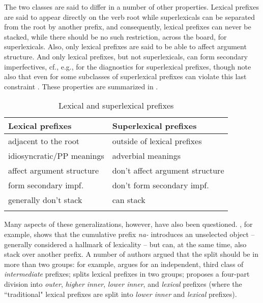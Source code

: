 \documentclass[output=paper,colorlinks,citecolor=brown]{langscibook}
\begin{document}

\noindent The two classes are said to differ in a number of other properties. Lexical prefixes are said to appear directly on the verb root while superlexicals can be separated from the root by another prefix, and consequently, lexical prefixes can never be stacked, while there should be no such restriction, across the board, for superlexicals. Also, only lexical prefixes are said to be able to affect argument structure. And only lexical prefixes, but not superlexicals, can form secondary imperfectives, cf., e.g., \citet[229]{svenonius2004slavic} for the diagnostics for superlexical prefixes, though note also that even for \citeauthor{svenonius2004slavic} some subclasses of superlexical prefixes can violate this last constraint  \citep[230]{svenonius2004slavic}. These properties are summarized in .

\begin{table}
\begin{tabular}{l l } 
 \lsptoprule
  {Lexical prefixes} &  {Superlexical prefixes}  \\
  \midrule
  adjacent to the root & outside of lexical prefixes  \\
 idiosyncratic/PP meanings & adverbial meanings \\ 
affect argument structure & don't affect argument structure  \\
form secondary impf. & don't form secondary impf.  \\
 generally don't stack & can stack  \\  
 \lspbottomrule
\end{tabular}
    \caption{Lexical and superlexical prefixes}
    \label{tab:LexAndSuperLex}
\end{table}

Many aspects of these generalizations, however, have also been questioned. \citet{zaucer2009vp}, for example, shows that the cumulative prefix \textit{na-} introduces an unselected object -- generally considered a hallmark of lexicality -- but can, at the same time, also stack over another prefix. A number of authors argued that the split should be in more than two groups: for example, \citet{tatevosov2008intermediate} argues for an independent, third class of \textit{intermediate} prefixes; \citet{babko2003perfectivity} splits lexical prefixes in two groups; \citet{markova2011nature} proposes a four-part division into \textit{outer}, \textit{higher inner}, \textit{lower inner}, and \textit{lexical} prefixes (where the ``traditional" lexical prefixes are split into \textit{lower inner} and \textit{lexical} prefixes).
\end{document}
